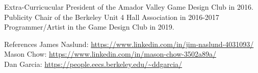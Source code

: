 \documentclass{resume} %
\begin{document}
\begin{rSection}{Extra-Curricucular} \itemsep -3pt
President of the Amador Valley Game Design Club in 2016. \\
Publicity Chair of the Berkeley Unit 4 Hall Association in 2016-2017 \\
Programmer/Artist in the Game Design Club in 2019.
\end{rSection}

%

\begin{rSection}{References}
James Naslund: \url{https://www.linkedin.com/in/jim-naslund-4031093/} \\
Mason Chow: \url{https://www.linkedin.com/in/mason-chow-3502a89a/} \\
Dan Garcia: \url{https://people.eecs.berkeley.edu/~ddgarcia/}
\end{rSection}
\end{document}
